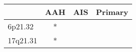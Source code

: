 \begin{tabular}{lccc}
\toprule
{} & AAH & AIS & Primary \\
\midrule
6p21.32  &   * &     &         \\
17q21.31 &   * &     &         \\
\bottomrule
\end{tabular}
